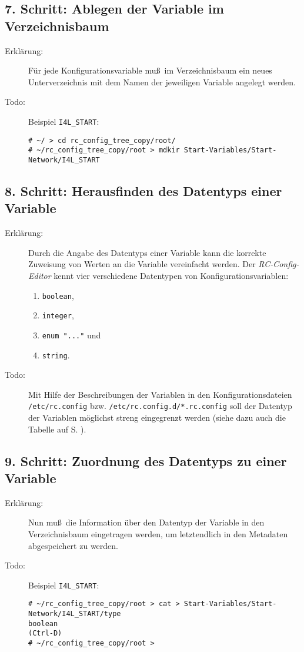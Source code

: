 \documentclass[pdftex,titlepage,10pt]{article}
\begin{document}
\subsection*{7. Schritt: Ablegen der Variable im Verzeichnisbaum}
\begin{description}
\item[Erkl\"arung:] F\"ur jede Konfigurationsvariable mu\ss \ im Verzeichnisbaum
  ein neues Unterverzeichnis mit dem Namen der jeweiligen Variable angelegt werden.
\item[Todo:] Beispiel {\tt I4L\_START}:
{\footnotesize\begin{verbatim}
# ~/ > cd rc_config_tree_copy/root/
# ~/rc_config_tree_copy/root > mdkir Start-Variables/Start-Network/I4L_START
\end{verbatim}}
\end{description}
\subsection*{8. Schritt: Herausfinden des Datentyps einer Variable}
\begin{description}
\item[Erkl\"arung:] Durch die Angabe des Datentyps einer Variable kann die korrekte
  Zuweisung von Werten an die Variable vereinfacht werden. Der {\em RC-Config-Editor}
  kennt vier verschiedene Datentypen von Konfigurationsvariablen:
  \begin{enumerate}
  \item {\tt boolean},
  \item {\tt integer},
  \item \verb+enum "..."+ und
  \item {\tt string}.
  \end{enumerate}
\item[Todo:] Mit Hilfe der Beschreibungen der Variablen in den Konfigurationsdateien
  {\tt /etc/rc.config} bzw. {\tt /etc/rc.config.d/*.rc.config} soll der Datentyp
  der Variablen m\"oglichst streng eingegrenzt werden (siehe dazu auch die Tabelle
  auf S. \pageref{tabelle}).
\end{description}
\subsection*{9. Schritt: Zuordnung des Datentyps zu einer Variable}
\begin{description}
\item[Erkl\"arung:] Nun mu\ss \ die Information \"uber den Datentyp der Variable in
  den Verzeichnisbaum eingetragen werden, um letztendlich in den Metadaten abgespeichert 
  zu werden.
\item[Todo:] Beispiel {\tt I4L\_START}:
{\footnotesize\begin{verbatim}
# ~/rc_config_tree_copy/root > cat > Start-Variables/Start-Network/I4L_START/type
boolean
(Ctrl-D)
# ~/rc_config_tree_copy/root >
\end{verbatim}}
\end{description}
\end{document}
